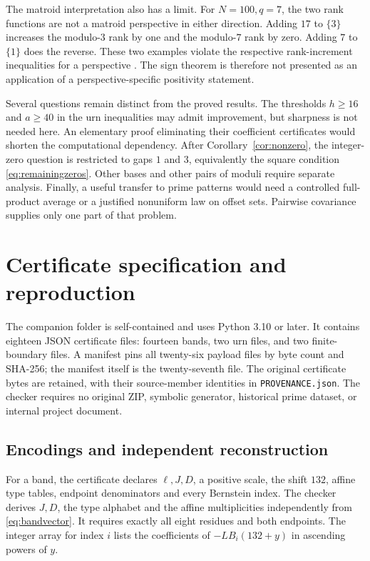 \documentclass[11pt,a4paper]{article}
\theoremstyle{remark}
\numberwithin{equation}{section}
\begin{document}
The matroid interpretation also has a limit.
For \(N=100,q=7\), the two rank functions are not a matroid
perspective in either direction. Adding \(17\) to \(\{3\}\)
increases the modulo-\(3\) rank by one and the modulo-\(7\) rank
by zero. Adding \(7\) to \(\{1\}\) does the reverse.
These two examples violate the respective rank-increment inequalities
for a perspective \cite[p.~304]{lasvergnas}.
The sign theorem is therefore not presented as an application of
a perspective-specific positivity statement.

Several questions remain distinct from the proved results.
The thresholds \(h\ge16\) and \(a\ge40\) in the urn inequalities
may admit improvement, but sharpness is not needed here.
An elementary proof eliminating their coefficient certificates
would shorten the computational dependency.
After Corollary~\ref{cor:nonzero}, the integer-zero question is
restricted to gaps \(1\) and \(3\), equivalently the square condition
\eqref{eq:remainingzeros}.
Other bases and other pairs of moduli require separate analysis.
Finally, a useful transfer to prime patterns would need a
controlled full-product average or a justified nonuniform law on
offset sets. Pairwise covariance supplies only one part of that problem.

\section{Certificate specification and reproduction}\label{sec:certificates}
The companion folder is self-contained and uses Python 3.10 or later.
It contains eighteen JSON certificate files:
fourteen bands, two urn files, and two finite-boundary files.
A manifest pins all twenty-six payload files by byte count and SHA-256;
the manifest itself is the twenty-seventh file.
The original certificate bytes are retained, with their source-member
identities in \texttt{PROVENANCE.json}.
The checker requires no original ZIP, symbolic generator, historical
prime dataset, or internal project document.

\subsection{Encodings and independent reconstruction}
For a band, the certificate declares \(\ell,J,D\), a positive scale,
the shift \(132\), affine type tables, endpoint denominators and every
Bernstein index.
The checker derives \(J,D\), the type alphabet and the affine
multiplicities independently from \eqref{eq:bandvector}.
It requires exactly all eight residues and both endpoints.
The integer array for index \(i\) lists the coefficients of
\(-L B_i(132+y)\) in ascending powers of \(y\).
\end{document}
